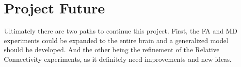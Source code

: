 \section{Project Future}

Ultimately there are two paths to continue this project. First, the \ac{FA} and \ac{MD} experiments could be expanded to the entire brain and a generalized model should be developed. And the other being the refinement of the Relative Connectivity experiments, as it definitely need improvements and new ideas.


